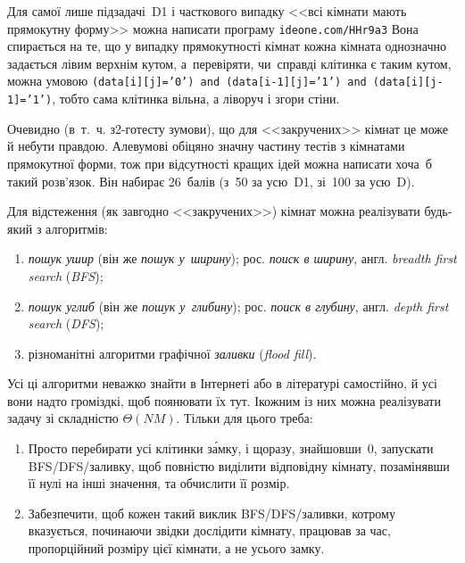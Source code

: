 \Tutorial	{}
Для самої лише підзадачі~D1 і часткового випадку <<всі кімнати мають прямокутну форму>> можна написати програму \verb"ideone.com/HHr9a3"\hspace{0.5em plus 1em}
Вона спирається на те, що у випадку прямокутності кімнат кожна кімната однозначно задається лівим верхнім кутом, а~перевіряти, чи~справді клітинка є таким кутом, можна умовою \texttt{\mbox{(data[i][j]='0')} \mbox{and} \mbox{(data[i-1][j]='1')} \mbox{and} \mbox{(data[i][j-1]='1')}}, тобто сама клітинка вільна, а ліворуч і згори стіни.

Очевидно (в~т.~ч. з\nolinebreak[3] \mbox{2-го}\nolinebreak[3] тесту з\nolinebreak[3] умови), що для <<закручених>> кімнат це може й не\nolinebreak[3] бути правдою. Але\nolinebreak[2] в\nolinebreak[3] умові обіцяно значну частину тестів з кімнатами прямокутної форми, тож при відсутності кращих ідей можна написати хоча~б такий розв’язок. Він набирає 26~балів (з~50 за усю~D1, зі~100 за усю~D).



Для відстеження (як завгодно <<закручених>>) кімнат можна реалізувати будь-який з алгоритмів:

\begin{enumerate}

\item	
\emph{пошук ушир} (він же \emph{пошук у~ширину}); рос. \emph{поиск в ширину}, англ. \emph{breadth first search} (\emph{BFS});

\item
\emph{пошук углиб} (він же \emph{пошук у~глибину}); рос. \emph{поиск в глубину}, англ. \emph{depth first search} (\emph{DFS});

\item
різноманітні алгоритми графічної \emph{заливки} (\emph{flood fill}).

\end{enumerate}

Усі ці алгоритми неважко знайти в Інтернеті або в літературі самостійно, й усі вони надто громіздкі, щоб поянювати їх тут. І\nolinebreak[3] кожним із них можна реалізувати задачу зі складністю $\Theta(NM)$. Тільки для цього треба:
\begin{enumerate}
\item
Просто перебирати усі клітинки з\'{а}мку, і щоразу, знайшовши~0, запускати BFS/DFS/заливку, щоб повністю виділити відповідну кімнату, позамінявши її нулі на інші значення, та обчислити її розмір.
\item
Забезпечити, щоб кожен такий виклик BFS/DFS/заливки, котрому вказується, починаючи звідки дослідити кімнату, працював за час, пропорційний розміру цієї кімнати, а не усього замку.
\end{enumerate}

